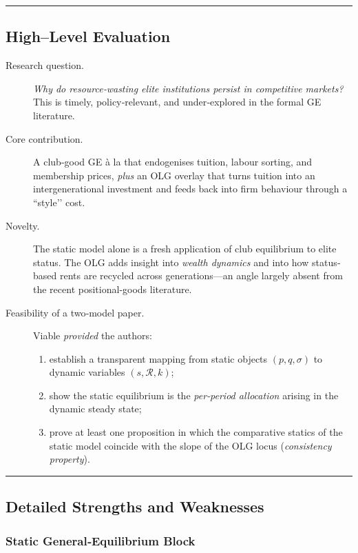 \documentclass[12pt,letterpaper]{article}
\begin{document}
\bigskip
\hrule
\bigskip

\subsection{High–Level Evaluation}

\begin{description}
	\item[Research question.] \emph{Why do resource‐wasting elite institutions persist in competitive markets?}  
	This is timely, policy‐relevant, and under‐explored in the formal GE literature.
	
	\item[Core contribution.]  A club‐good GE à la \citet{Ellickson1999} that endogenises tuition, labour sorting, and membership prices, \emph{plus} an OLG overlay that turns tuition into an intergenerational investment and feeds back into firm behaviour through a “style’’ cost.
	
	\item[Novelty.]  The static model alone is a fresh application of club equilibrium to elite status.  
	The OLG adds insight into \emph{wealth dynamics} and into how status‐based rents are recycled across generations—an angle largely absent from the recent positional‐goods literature.  
	
	\item[Feasibility of a two‐model paper.]  Viable \emph{provided} the authors:
	\begin{enumerate}%
		\item establish a transparent mapping from static objects $(p,q,\sigma)$ to dynamic variables $(s,\mathcal R,k)$;
		\item show the static equilibrium is the \emph{per‐period allocation} arising in the dynamic steady state;
		\item prove at least one proposition in which the comparative statics of the static model coincide with the slope of the OLG locus (\emph{consistency property}).
	\end{enumerate}
\end{description}

\bigskip
\hrule
\bigskip

\subsection{Detailed Strengths and Weaknesses}

\subsubsection{Static General‐Equilibrium Block}
\end{document}
